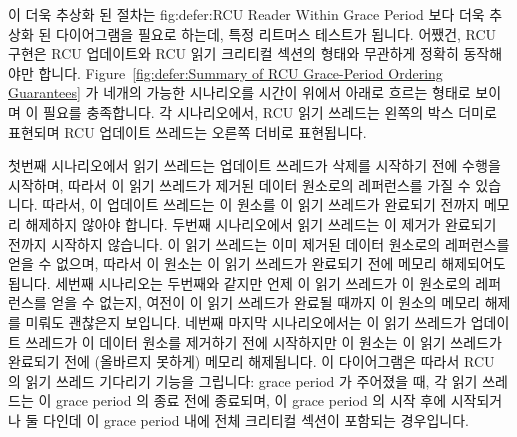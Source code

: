 이 더욱 추상화 된 절차는
{fig:defer:RCU Reader Within Grace Period} 보다 더욱 추상화 된 다이어그램을
필요로 하는데, 특정 리트머스 테스트가 됩니다.
어쨌건, RCU 구현은 RCU 업데이트와 RCU 읽기 크리티컬 섹션의 형태와 무관하게
정확히 동작해야만 합니다.
Figure~\ref{fig:defer:Summary of RCU Grace-Period Ordering Guarantees}
가 네개의 가능한 시나리오를 시간이 위에서 아래로 흐르는 형태로 보이며 이 필요를
충족합니다.
각 시나리오에서, RCU 읽기 쓰레드는 왼쪽의 박스 더미로 표현되며 RCU 업데이트
쓰레드는 오른쪽 더비로 표현됩니다.

첫번째 시나리오에서 읽기 쓰레드는 업데이트 쓰레드가 삭제를 시작하기 전에 수행을
시작하며, 따라서 이 읽기 쓰레드가 제거된 데이터 원소로의 레퍼런스를 가질 수
있습니다.
따라서, 이 업데이트 쓰레드는 이 원소를 이 읽기 쓰레드가 완료되기 전까지 메모리
해제하지 않아야 합니다.
두번째 시나리오에서 읽기 쓰레드는 이 제거가 완료되기 전까지 시작하지 않습니다.
이 읽기 쓰레드는 이미 제거된 데이터 원소로의 레퍼런스를 얻을 수 없으며, 따라서
이 원소는 이 읽기 쓰레드가 완료되기 전에 메모리 해제되어도 됩니다.
세번째 시나리오는 두번째와 같지만 언제 이 읽기 쓰레드가 이 원소로의 레퍼런스를
얻을 수 없는지, 여전이 이 읽기 쓰레드가 완료될 때까지 이 원소의 메모리 해제를
미뤄도 괜찮은지 보입니다.
네번째 마지막 시나리오에서는 이 읽기 쓰레드가 업데이트 쓰레드가 이 데이터
원소를 제거하기 전에 시작하지만 이 원소는 이 읽기 쓰레드가 완료되기 전에
(올바르지 못하게) 메모리 해제됩니다.
이 다이어그램은 따라서 RCU 의 읽기 쓰레드 기다리기 기능을 그립니다:
grace period 가 주어졌을 때, 각 읽기 쓰레드는 이 grace period 의 종료 전에
종료되며, 이 grace period 의 시작 후에 시작되거나 둘 다인데 이 grace period
내에 전체 크리티컬 섹션이 포함되는 경우입니다.

\iffalse

